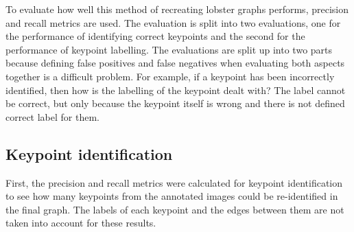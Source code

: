 \newcommand{\fourplot}[3]{
\begin{minipage}{0.45\textwidth}
	#1{#2}{0.3}{#3}
\end{minipage}
%
\begin{minipage}{0.45\textwidth}
	#1{#2}{0.5}{#3}
\end{minipage}
\\
\begin{minipage}{0.45\textwidth}
	#1{#2}{0.7}{#3}
\end{minipage}
%
\begin{minipage}{0.45\textwidth}
	#1{#2}{0.9}{#3}
\end{minipage}
}

\newcommand{\fourplotlabel}[4]{
\begin{minipage}{0.45\textwidth}
	#1{#2}{0.3}{#3}{#4}
\end{minipage}
%
\begin{minipage}{0.45\textwidth}
	#1{#2}{0.5}{#3}{#4}
\end{minipage}
\\
\begin{minipage}{0.45\textwidth}
	#1{#2}{0.7}{#3}{#4}
\end{minipage}
%
\begin{minipage}{0.45\textwidth}
	#1{#2}{0.9}{#3}{#4}
\end{minipage}
}


To evaluate how well this method of recreating lobster graphs performs, precision and recall metrics are used. The evaluation is split into two evaluations, one for the performance of identifying correct keypoints and the second for the performance of keypoint labelling. The evaluations are split up into two parts because defining false positives and false negatives when evaluating both aspects together is a difficult problem. For example, if a keypoint has been incorrectly identified, then how is the labelling of the keypoint dealt with? The label cannot be correct, but only because the keypoint itself is wrong and there is not defined correct label for them. 

\subsection{Keypoint identification}
First, the precision and recall metrics were calculated for keypoint identification to see how many keypoints from the annotated images could be re-identified in the final graph. The labels of each keypoint and the edges between them are not taken into account for these results. 

